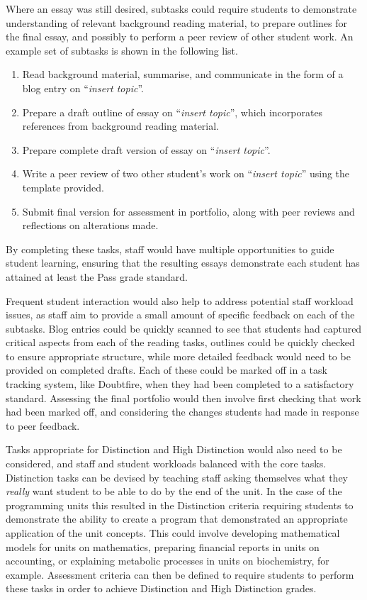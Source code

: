 Where an essay was still desired, subtasks could require students to demonstrate understanding of relevant background reading material, to prepare outlines for the final essay, and possibly to perform a peer review of other student work. An example set of subtasks is shown in the following list. 

\begin{enumerate}
	\item Read background material, summarise, and communicate in the form of a blog entry on ``\emph{insert topic}''.
	\item Prepare a draft outline of essay on ``\emph{insert topic}'', which incorporates references from background reading material.
	\item Prepare complete draft version of essay on ``\emph{insert topic}''.
	\item Write a peer review of two other student's work on ``\emph{insert topic}'' using the template provided. 
	\item Submit final version for assessment in portfolio, along with peer reviews and reflections on alterations made.
\end{enumerate}

By completing these tasks, staff would have multiple opportunities to guide student learning, ensuring that the resulting essays demonstrate each student has attained at least the Pass grade standard. 

Frequent student interaction would also help to address potential staff workload issues, as staff aim to provide a small amount of specific feedback on each of the subtasks. Blog entries could be quickly scanned to see that students had captured critical aspects from each of the reading tasks, outlines could be quickly checked to ensure appropriate structure, while more detailed feedback would need to be provided on completed drafts. Each of these could be marked off in a task tracking system, like Doubtfire, when they had been completed to a satisfactory standard. Assessing the final portfolio would then involve first checking that work had been marked off, and considering the changes students had made in response to peer feedback.

Tasks appropriate for Distinction and High Distinction would also need to be considered, and staff and student workloads balanced with the core tasks. Distinction tasks can be devised by teaching staff asking themselves what they \emph{really} want student to be able to do by the end of the unit. In the case of the programming units this resulted in the Distinction criteria requiring students to demonstrate the ability to create a program that demonstrated an appropriate application of the unit concepts. This could involve developing mathematical models for units on mathematics, preparing financial reports in units on accounting, or explaining metabolic processes in units on biochemistry, for example. Assessment criteria can then be defined to require students to perform these tasks in order to achieve Distinction and High Distinction grades.


